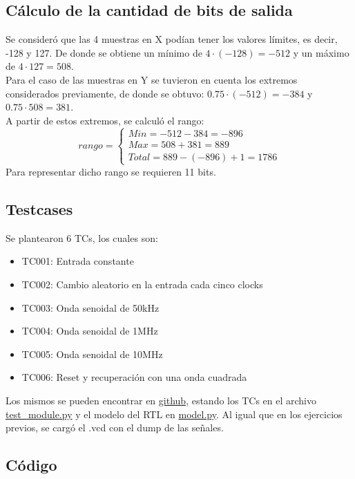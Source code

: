 \documentclass{article}
\begin{document}
    \subsection{Cálculo de la cantidad de bits de salida}
    Se consideró que las 4 muestras en X podían tener los valores límites, es decir, -128 y 127. De donde se obtiene un mínimo de $4\cdot(-128) = -512$ y un máximo de $4\cdot127 = 508$.\\
    Para el caso de las muestras en Y se tuvieron en cuenta los extremos considerados previamente, de donde se obtuvo: $0.75\cdot(-512) = -384$ y $0.75\cdot508 = 381$.\\
    A partir de estos extremos, se calculó el rango:
    \[
        rango =
        \begin{cases}
            Min = -512-384 = -896\\
            Max = 508+381 = 889\\
            Total = 889 - (-896) + 1 = 1786
        \end{cases}
    \]
    Para representar dicho rango se requieren 11 bits.

    \subsection{Testcases}
    Se plantearon 6 TCs, los cuales son:
    \begin{itemize}
        \item TC001: Entrada constante
        \item TC002: Cambio aleatorio en la entrada cada cinco clocks
        \item TC003: Onda senoidal de 50kHz
        \item TC004: Onda senoidal de 1MHz
        \item TC005: Onda senoidal de 10MHz
        \item TC006: Reset y recuperación con una onda cuadrada
    \end{itemize}
    Los mismos se pueden encontrar en \href{https://github.com/msebgarcia/DDA2024/tree/main/GP01/iir_filter/tb}{github}, estando los TCs en el archivo \href{https://github.com/msebgarcia/DDA2024/blob/main/GP01/iir_filter/tb/test_module.py}{test\_module.py} y el modelo del RTL en \href{https://github.com/msebgarcia/DDA2024/blob/main/GP01/iir_filter/tb/model.py}{model.py}. Al igual que en los ejercicios previos, se cargó el .vcd con el dump de las señales.

    \newpage
    \subsection{Código}
    \inputminted[fontsize=\scriptsize]{systemverilog}{../iir_filter/rtl/iir_filter.sv}
 
\end{document}
